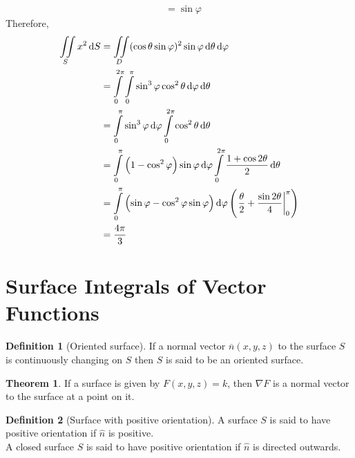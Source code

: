 \documentclass[fleqn, a4paper, 8pt, twoside]{amsart}
\theoremstyle{definition}
\theoremstyle{bluedefinition}
\newtheorem{definition}{Definition}
\theoremstyle{redtheorem}
\newtheorem{theorem}{Theorem}
\begin{document}
\begin{multicols}{2}
\begin{spacing}{0.7}
\begin{solution}
\begin{align*}
                                                                                   & = \sin \varphi
	\end{align*}
	Therefore,
	\begin{align*}
		\iint\limits_{S} x^2 \dif S & = \iint\limits_{D} (\cos \theta \sin \varphi)^2 \sin \varphi \dif \theta \dif \varphi                                                                                             \\
                                            & = \int\limits_{0}^{2 \pi} \int\limits_{0}^{\pi} \sin^3 \varphi \cos^2 \theta \dif \varphi \dif \theta                                                                             \\
                                            & = \int\limits_{0}^{\pi} \sin^3 \varphi \dif \varphi \int\limits_{0}^{2 \pi} \cos^2 \theta \dif \theta                                                                             \\
                                            & = \int\limits_{0}^{\pi} \left( 1 - \cos^2 \varphi \right) \sin \varphi \dif \varphi \int\limits_{0}^{2 \pi} \frac{1 + \cos 2 \theta}{2} \dif \theta                               \\
                                            & = \int\limits_{0}^{\pi} \left( \sin \varphi - \cos^2 \varphi \sin \varphi \right) \dif \varphi \left( \left. \frac{\theta}{2} + \frac{\sin 2 \theta}{4} \right|_{0}^{\pi} \right) \\
                                            & = \frac{4 \pi}{3}
	\end{align*}
\end{solution}

\section{Surface Integrals of Vector Functions}

\begin{definition}[Oriented surface]
	If a normal vector $\overline{n}(x,y,z)$ to the surface $S$ is continuously changing on $S$ then $S$ is said to be an oriented surface.
\end{definition}

\begin{theorem}
	If a surface is given by $F(x,y,z) = k$, then $\nabla F$ is a normal vector to the surface at a point on it.
\end{theorem}

\begin{definition}[Surface with positive orientation]
	A surface $S$ is said to have positive orientation if $\hat{n}$ is positive.\\
	A closed surface $S$ is said to have positive orientation if $\hat{n}$ is directed outwards.
\end{definition}


\end{spacing}
\end{multicols}
\end{document}
